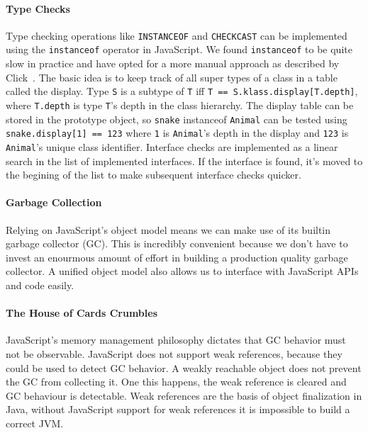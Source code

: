 \documentclass{acm_proc_article-sp}
\begin{document}
\paragraph{Type Checks}

Type checking operations like \texttt{INSTANCEOF} and \texttt{CHECKCAST} can be implemented using the \texttt{instanceof} operator in JavaScript.
We found \texttt{instanceof} to be quite slow in practice and have opted for a more manual approach as described by Click~\cite{Click2002}.
The basic idea is to keep track of all super types of a class in a table called the display.
Type \texttt{S} is a subtype of \texttt{T} iff \texttt{T == S.klass.display[T.depth]}, where \texttt{T.depth} is type \texttt{T}'s depth in the class hierarchy. The display table can be stored in the prototype object, so \texttt{snake} instanceof \texttt{Animal} can be tested using \texttt{snake.display[1] == 123} where \texttt{1} is \texttt{Animal}'s depth in the display and \texttt{123} is \texttt{Animal}'s unique class identifier.
Interface checks are implemented as a linear search in the list of implemented interfaces.
If the interface is found, it's moved to the begining of the list to make subsequent interface checks quicker.

\paragraph{Garbage Collection}

Relying on JavaScript's object model means we can make use of its builtin garbage collector (GC).
This is incredibly convenient because we don't have to invest an enourmous amount of effort in building a production quality garbage collector.
A unified object model also allows us to interface with JavaScript APIs and code easily.

\paragraph{The House of Cards Crumbles}

JavaScript's memory management philosophy dictates that GC behavior must not be observable.
JavaScript does not support weak references, because they could be used to detect GC behavior.
A weakly reachable object does not prevent the GC from collecting it.
One this happens, the weak reference is cleared and GC behaviour is detectable.
Weak references are the basis of object finalization in Java, without JavaScript support for weak references it is impossible to build a correct JVM. 
\end{document}
